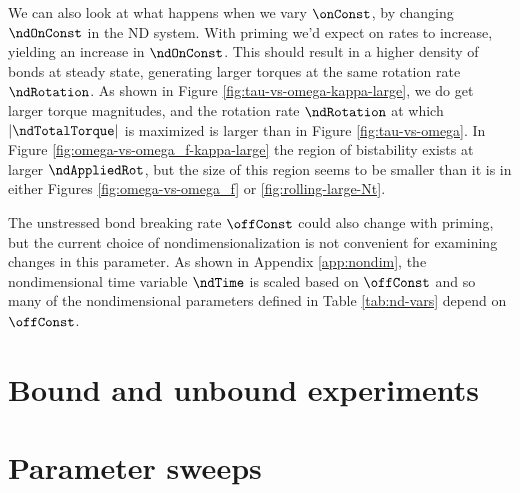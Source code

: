 We can also look at what happens when we vary $\onConst$, by changing
$\ndOnConst$ in the ND system. With priming we'd expect on rates to
increase, yielding an increase in $\ndOnConst$. This should result in
a higher density of bonds at steady state, generating larger torques
at the same rotation rate $\ndRotation$. As shown in Figure
\ref{fig:tau-vs-omega-kappa-large}, we do get larger torque
magnitudes, and the rotation rate $\ndRotation$ at which
$|\ndTotalTorque|$ is maximized is larger than in Figure
\ref{fig:tau-vs-omega}. In Figure
\ref{fig:omega-vs-omega_f-kappa-large} the region of bistability
exists at larger $\ndAppliedRot$, but the size of this region seems to
be smaller than it is in either Figures \ref{fig:omega-vs-omega_f} or
\ref{fig:rolling-large-Nt}.

The unstressed bond breaking rate $\offConst$ could also change with
priming, but the current choice of nondimensionalization is not
convenient for examining changes in this parameter. As shown in
Appendix \ref{app:nondim}, the nondimensional time variable $\ndTime$
is scaled based on $\offConst$ and so many of the nondimensional
parameters defined in Table \ref{tab:nd-vars} depend on $\offConst$. 

\section{Bound and unbound experiments}
\label{sec:bound-unbo-exper}

\section{Parameter sweeps}
\label{sec:parameter-sweeps}

